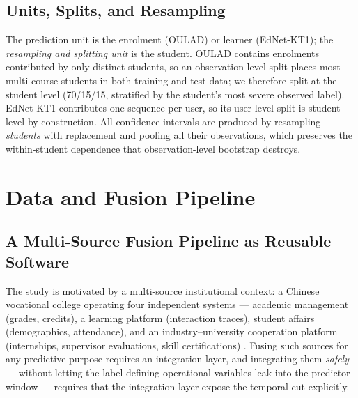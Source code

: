 \documentclass[sn-mathphys,Numbered]{sn-jnl}
\begin{document}
\subsection{Units, Splits, and Resampling}\label{sec:form_units}

The prediction unit is the enrolment (OULAD) or learner (EdNet-KT1); the \emph{resampling and splitting unit} is the student. OULAD contains \nOULADenrol{} enrolments contributed by only \nOULADstudents{} distinct students, so an observation-level split places most multi-course students in both training and test data; we therefore split at the student level (70/15/15, stratified by the student's most severe observed label). EdNet-KT1 contributes one sequence per user, so its user-level split is student-level by construction. All confidence intervals are produced by resampling \emph{students} with replacement and pooling all their observations, which preserves the within-student dependence that observation-level bootstrap destroys.

\section{Data and Fusion Pipeline}\label{sec:data}

\subsection{A Multi-Source Fusion Pipeline as Reusable Software}\label{sec:pipeline}

The study is motivated by a multi-source institutional context: a Chinese vocational college operating four independent systems --- academic management (grades, credits), a learning platform (interaction traces), student affairs (demographics, attendance), and an industry--university cooperation platform (internships, supervisor evaluations, skill certifications) \cite{Liu2023}. Fusing such sources for any predictive purpose requires an integration layer, and integrating them \emph{safely} --- without letting the label-defining operational variables leak into the predictor window --- requires that the integration layer expose the temporal cut explicitly.
\end{document}
